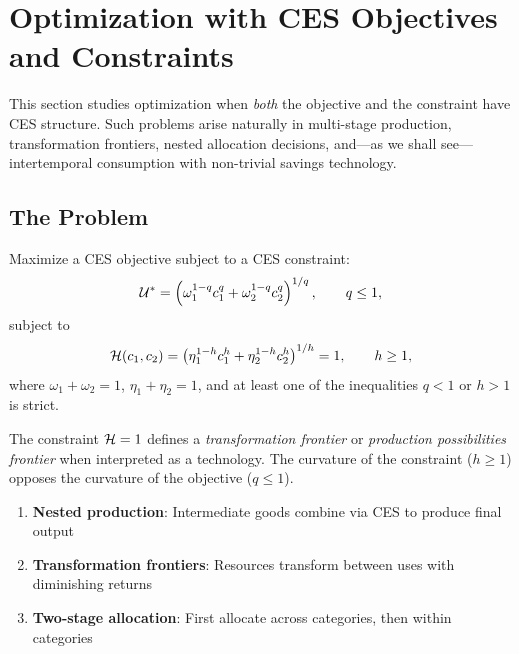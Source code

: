 
\chapter{Optimization with CES Objectives and Constraints}
\label{sec:ces-constraints}

This section studies optimization when \emph{both} the objective and the constraint have CES structure. Such problems arise naturally in multi-stage production, transformation frontiers, nested allocation decisions, and---as we shall see---intertemporal consumption with non-trivial savings technology.

\section{The Problem}
\label{subsec:ces-ces-problem}

\begin{definition}
\label{def:ces-ces-problem}
Maximize a CES objective subject to a CES constraint:
\begin{equation}
\label{eq:ces-ces-objective}
\mathcal{U}^{*} = \left( \omega_1^{1-q} c_1^{q} + \omega_2^{1-q} c_2^{q} \right)^{1/q}, \qquad q \leq 1,
\end{equation}
subject to
\begin{equation}
\label{eq:ces-ces-constraint}
\mathcal{H}(c_1, c_2) = \left( \eta_1^{1-h} c_1^{h} + \eta_2^{1-h} c_2^{h} \right)^{1/h} = 1, \qquad h \geq 1,
\end{equation}
where $\omega_1 + \omega_2 = 1$, $\eta_1 + \eta_2 = 1$, and at least one of the inequalities $q < 1$ or $h > 1$ is strict.
\end{definition}

The constraint $\mathcal{H} = 1$ defines a \emph{transformation frontier} or \emph{production possibilities frontier} when interpreted as a technology. The curvature of the constraint ($h \geq 1$) opposes the curvature of the objective ($q \leq 1$).

\begin{calloutnote}
\begin{enumerate}[label=(\roman*), leftmargin=*]
    \item \textbf{Nested production}: Intermediate goods combine via CES to produce final output
    \item \textbf{Transformation frontiers}: Resources transform between uses with diminishing returns
    \item \textbf{Two-stage allocation}: First allocate across categories, then within categories
\end{enumerate}
\end{calloutnote}

